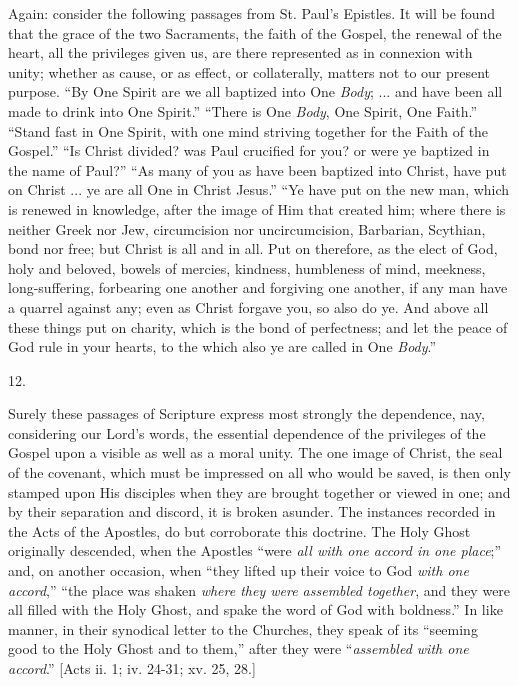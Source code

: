 Again: consider the following passages from St. Paul's Epistles. It
will be found that the grace of the two Sacraments, the faith of the
Gospel, the renewal of the heart, all the privileges given us, are
there represented as in connexion with unity; whether as cause, or as
effect, or collaterally, matters not to our present purpose. ``By
One Spirit are we all baptized into One \emph{Body}; ... and have been
all made to drink into One Spirit.'' ``There is One \emph{Body},
One Spirit, One Faith.'' ``Stand fast in One Spirit, with one
mind striving together for the Faith of the Gospel.'' ``Is
Christ divided? was Paul crucified for you? or were ye baptized in the
name of Paul?'' ``As many of you as have been baptized into
Christ, have put on Christ ... ye are all One in Christ Jesus.''
``Ye have put on the new man, which is renewed in knowledge, after
the image of Him that created him; where there is neither Greek nor
Jew, circumcision nor uncircumcision, Barbarian, Scythian, bond nor
free; but Christ is all and in all. Put on therefore, as the elect of
God, holy and beloved, bowels of mercies, kindness, humbleness of
mind, meekness, long-suffering, forbearing one another and forgiving
one another, if any man have a quarrel against any; even as Christ
forgave you, so also do ye. And above all these things put on charity,
which is the bond of perfectness; and let the peace of God rule in
your hearts, to the which also ye are called in One \emph{Body}.''

12.

Surely these passages of Scripture express most strongly the
dependence, nay, considering our Lord's words, the essential
dependence of the privileges of the Gospel upon a visible as well as a
moral unity. The one image of Christ, the seal of the covenant, which
must be impressed on all who would be saved, is then only stamped upon
His disciples when they are brought together or viewed in one; and by their separation and discord, it is broken asunder. The
instances recorded in the Acts of the Apostles, do but corroborate
this doctrine. The Holy Ghost originally descended, when the Apostles
``were \emph{all with one accord in one place};'' and, on
another occasion, when ``they lifted up their voice to God \emph{with
one accord},'' ``the place was shaken \emph{where they were
assembled together}, and they were all filled with the Holy Ghost,
and spake the word of God with boldness.'' In like manner, in
their synodical letter to the Churches, they speak of its
``seeming good to the Holy Ghost and to them,'' after they
were ``\emph{assembled with one accord}.'' [Acts ii. 1; iv.
24-31; xv. 25, 28.]

